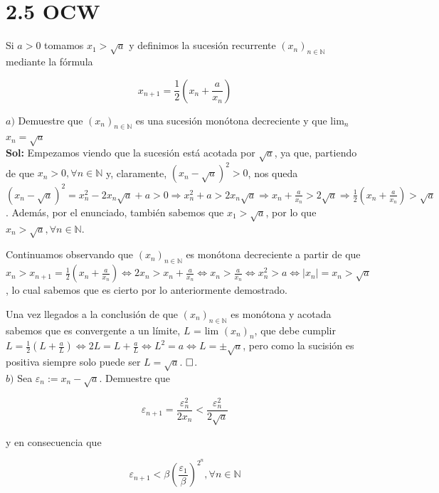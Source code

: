\documentclass{article}
\begin{document}
\section{2.5 OCW}

Si $a > 0$ tomamos $x_1 > \sqrt{a}$ y definimos la sucesión recurrente $(x_n)_{n \in \mathbb{N}}$ mediante la fórmula

\[x_{n + 1} = \frac{1}{2}\left(x_n + \frac{a}{x_n}\right)\]

$a)$ Demuestre que $(x_n)_{n \in \mathbb{N}}$ es una sucesión monótona decreciente y que lim$_n$ $ x_n = \sqrt{a}$ \\

\textbf{Sol:} Empezamos viendo que la sucesión está acotada por $\sqrt{a}$, ya que, partiendo de que $x_n > 0, \forall n \in \mathbb{N}$ y, claramente, $(x_n - \sqrt{a})^2 > 0$, nos queda $(x_n - \sqrt{a})^2 = x_n^2 - 2x_n\sqrt{a} + a > 0 \Longrightarrow x_n^2 + a > 2x_n\sqrt{a} \Longrightarrow x_n + \frac{a}{x_n} > 2\sqrt{a} \Longrightarrow \frac{1}{2}\left(x_n + \frac{a}{x_n}\right) > \sqrt{a}$. Además, por el enunciado, también sabemos que $x_1 > \sqrt{a}$, por lo que $x_n > \sqrt{a}, \forall n \in \mathbb{N}$.

Continuamos observando que $(x_n)_{n \in \mathbb{N}}$ es monótona decreciente a partir de que $x_n > x_{n + 1} = \frac{1}{2}\left(x_n + \frac{a}{x_n}\right) \Longleftrightarrow 2x_n > x_n + \frac{a}{x_n} \Longleftrightarrow x_n > \frac{a}{x_n} \Longleftrightarrow x_n^2 > a \Longleftrightarrow |x_n| = x_n > \sqrt{a}$, lo cual sabemos que es cierto por lo anteriormente demostrado.

Una vez llegados a la conclusión de que $(x_n)_{n \in \mathbb{N}}$ es monótona y acotada sabemos que es convergente a un límite, $L$ = lim $(x_n)_{n}$, que debe cumplir $L = \frac{1}{2}\left(L + \frac{a}{L}\right) \Longleftrightarrow 2L = L + \frac{a}{L} \Longleftrightarrow L^2 = a \Longleftrightarrow L = \pm\sqrt{a}$, pero como la sucisión es positiva siempre solo puede ser $L = \sqrt{a}$. $\hfill\square$. \\

$b)$ Sea $\varepsilon_n := x_n - \sqrt{a}$. Demuestre que 

\[\varepsilon_{n + 1} = \frac{\varepsilon_n^2}{2x_n} < \frac{\varepsilon_n^2}{2\sqrt{a}}\]

y en consecuencia que 

\[\varepsilon_{n + 1} < \beta \left(\frac{\varepsilon_1}{\beta}\right)^{2^n}, \forall n \in \mathbb{N}\] 
\end{document}
